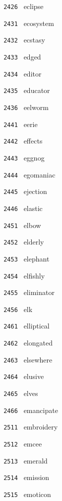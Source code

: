 \documentclass[11pt]{article}
\begin{document}
\begin{multicols}{6}
\noindent \texttt{ 2426 } eclipse  \par
\vspace{3mm}
\noindent \texttt{ 2431 } ecosystem  \par
\noindent \texttt{ 2432 } ecstasy  \par
\noindent \texttt{ 2433 } edged  \par
\noindent \texttt{ 2434 } editor  \par
\noindent \texttt{ 2435 } educator  \par
\noindent \texttt{ 2436 } eelworm  \par
\vspace{3mm}
\noindent \texttt{ 2441 } eerie  \par
\noindent \texttt{ 2442 } effects  \par
\noindent \texttt{ 2443 } eggnog  \par
\noindent \texttt{ 2444 } egomaniac  \par
\noindent \texttt{ 2445 } ejection  \par
\noindent \texttt{ 2446 } elastic  \par
\vspace{3mm}
\noindent \texttt{ 2451 } elbow  \par
\noindent \texttt{ 2452 } elderly  \par
\noindent \texttt{ 2453 } elephant  \par
\noindent \texttt{ 2454 } elfishly  \par
\noindent \texttt{ 2455 } eliminator  \par
\noindent \texttt{ 2456 } elk  \par
\vspace{3mm}
\noindent \texttt{ 2461 } elliptical  \par
\noindent \texttt{ 2462 } elongated  \par
\noindent \texttt{ 2463 } elsewhere  \par
\noindent \texttt{ 2464 } elusive  \par
\noindent \texttt{ 2465 } elves  \par
\noindent \texttt{ 2466 } emancipate  \par
\noindent \texttt{ 2511 } embroidery  \par
\noindent \texttt{ 2512 } emcee  \par
\noindent \texttt{ 2513 } emerald  \par
\noindent \texttt{ 2514 } emission  \par
\noindent \texttt{ 2515 } emoticon  \par

\end{multicols}
\end{document}
